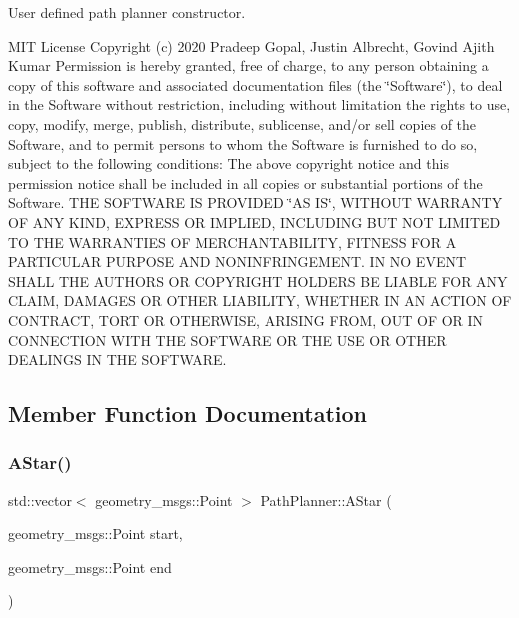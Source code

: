 User defined path planner constructor. 

M\+IT License Copyright (c) 2020 Pradeep Gopal, Justin Albrecht, Govind Ajith Kumar Permission is hereby granted, free of charge, to any person obtaining a copy of this software and associated documentation files (the \char`\"{}\+Software\char`\"{}), to deal in the Software without restriction, including without limitation the rights to use, copy, modify, merge, publish, distribute, sublicense, and/or sell copies of the Software, and to permit persons to whom the Software is furnished to do so, subject to the following conditions\+: The above copyright notice and this permission notice shall be included in all copies or substantial portions of the Software. T\+HE S\+O\+F\+T\+W\+A\+RE IS P\+R\+O\+V\+I\+D\+ED \char`\"{}\+A\+S I\+S\char`\"{}, W\+I\+T\+H\+O\+UT W\+A\+R\+R\+A\+N\+TY OF A\+NY K\+I\+ND, E\+X\+P\+R\+E\+SS OR I\+M\+P\+L\+I\+ED, I\+N\+C\+L\+U\+D\+I\+NG B\+UT N\+OT L\+I\+M\+I\+T\+ED TO T\+HE W\+A\+R\+R\+A\+N\+T\+I\+ES OF M\+E\+R\+C\+H\+A\+N\+T\+A\+B\+I\+L\+I\+TY, F\+I\+T\+N\+E\+SS F\+OR A P\+A\+R\+T\+I\+C\+U\+L\+AR P\+U\+R\+P\+O\+SE A\+ND N\+O\+N\+I\+N\+F\+R\+I\+N\+G\+E\+M\+E\+NT. IN NO E\+V\+E\+NT S\+H\+A\+LL T\+HE A\+U\+T\+H\+O\+RS OR C\+O\+P\+Y\+R\+I\+G\+HT H\+O\+L\+D\+E\+RS BE L\+I\+A\+B\+LE F\+OR A\+NY C\+L\+A\+IM, D\+A\+M\+A\+G\+ES OR O\+T\+H\+ER L\+I\+A\+B\+I\+L\+I\+TY, W\+H\+E\+T\+H\+ER IN AN A\+C\+T\+I\+ON OF C\+O\+N\+T\+R\+A\+CT, T\+O\+RT OR O\+T\+H\+E\+R\+W\+I\+SE, A\+R\+I\+S\+I\+NG F\+R\+OM, O\+UT OF OR IN C\+O\+N\+N\+E\+C\+T\+I\+ON W\+I\+TH T\+HE S\+O\+F\+T\+W\+A\+RE OR T\+HE U\+SE OR O\+T\+H\+ER D\+E\+A\+L\+I\+N\+GS IN T\+HE S\+O\+F\+T\+W\+A\+RE. 

\subsection{Member Function Documentation}
\mbox{\label{class_path_planner_abc06e42be6f237be6c5028143d7d9ba0}} 
\subsubsection{\texorpdfstring{A\+Star()}{AStar()}}
{\footnotesize\ttfamily std\+::vector$<$ geometry\+\_\+msgs\+::\+Point $>$ Path\+Planner\+::\+A\+Star (\begin{DoxyParamCaption}\item[{geometry\+\_\+msgs\+::\+Point}]{start,  }\item[{geometry\+\_\+msgs\+::\+Point}]{end }\end{DoxyParamCaption})}



